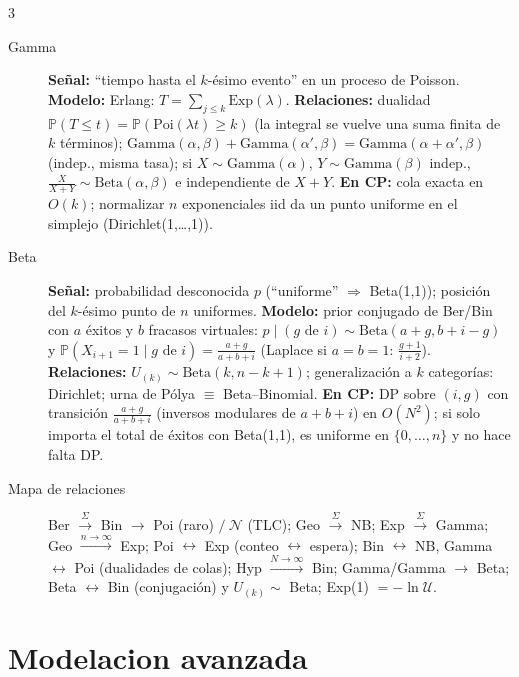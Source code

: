 \documentclass[8pt, spanish, mexico, letterpaper]{extarticle}
\newcommand{\Prob}{\mathbb{P}}
\newcommand{\<}{<}
\begin{document}
\begin{multicols*}{3}
\begin{description}
\item[Gamma] \textbf{Señal:} ``tiempo hasta el $k$-ésimo evento'' en un proceso de Poisson. \textbf{Modelo:} Erlang: $T=\sum_{j\le k}\mathrm{Exp}(\lambda)$. \textbf{Relaciones:} dualidad $\Prob(T\le t)=\Prob(\mathrm{Poi}(\lambda t)\ge k)$ (la integral se vuelve una suma finita de $k$ términos); $\mathrm{Gamma}(\alpha,\beta)+\mathrm{Gamma}(\alpha',\beta)=\mathrm{Gamma}(\alpha + \alpha',\beta)$ (indep., misma tasa); si $X\sim\mathrm{Gamma}(\alpha)$, $Y\sim\mathrm{Gamma}(\beta)$ indep., $\frac X{X+Y}\sim\mathrm{Beta}(\alpha,\beta)$ e independiente de $X + Y$. \textbf{En CP:} cola exacta en $O(k)$; normalizar $n$ exponenciales iid da un punto uniforme en el simplejo (Dirichlet(1,\dots,1)).

\item[Beta] \textbf{Señal:} probabilidad desconocida $p$ (``uniforme'' $\Rightarrow$ Beta(1,1)); posición del $k$-ésimo punto de $n$ uniformes. \textbf{Modelo:} prior conjugado de Ber/Bin con $a$ éxitos y $b$ fracasos virtuales: $p\mid(g\text{ de }i)\sim\mathrm{Beta}(a + g,b + i - g)$ y $\Prob(X_{i+1}{=}1\mid g\text{ de }i)=\frac{a+g}{a+b+i}$ (Laplace si $a{=}b{=}1$: $\frac{g+1}{i+2}$). \textbf{Relaciones:} $U_{(k)}\sim\mathrm{Beta}(k,n - k + 1)$; generalización a $k$ categorías: Dirichlet; urna de Pólya $\equiv$ Beta--Binomial. \textbf{En CP:} DP sobre $(i,g)$ con transición $\frac{a+g}{a+b+i}$ (inversos modulares de $a + b + i$) en $O(N^2)$; si solo importa el total de éxitos con Beta(1,1), es uniforme en $\{0,\dots,n\}$ y no hace falta DP.

\item[Mapa de relaciones] Ber $\xrightarrow{\Sigma}$ Bin $\to$ Poi (raro) $/\ \mathcal N$ (TLC); Geo $\xrightarrow{\Sigma}$ NB; Exp $\xrightarrow{\Sigma}$ Gamma; Geo $\xrightarrow{n\to\infty}$ Exp; Poi $\leftrightarrow$ Exp (conteo $\leftrightarrow$ espera); Bin $\leftrightarrow$ NB, Gamma $\leftrightarrow$ Poi (dualidades de colas); Hyp $\xrightarrow{N\to\infty}$ Bin; Gamma/Gamma $\to$ Beta; Beta $\leftrightarrow$ Bin (conjugación) y $U_{(k)}\sim$ Beta; Exp(1) $=-\ln\mathcal U$.
\end{description}


\clearpage
\section{Modelacion avanzada}
\begin{description}


\end{description}
\end{multicols*}
\end{document}
